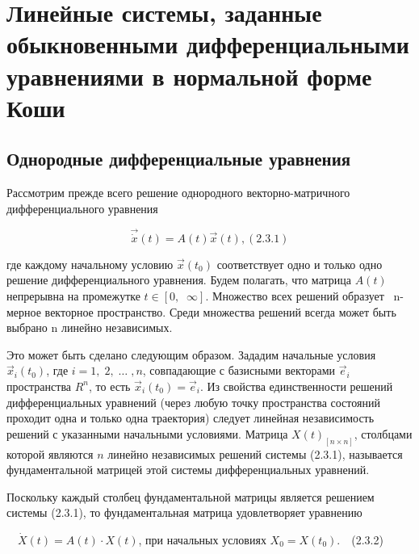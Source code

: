 \bigskip



\bigskip

\section{Линейные системы, заданные обыкновенными   дифференциальными уравнениями в нормальной форме Коши}
\subsection{Однородные дифференциальные уравнения}
\bigskip


		Рассмотрим прежде всего решение однородного векторно-матричного дифференциального уравнения



	\begin{equation}\label{key}
	\vec{\dot x}(t)=A(t)\vec x(t),  (2.3.1)
	\end{equation}



		где каждому начальному условию  $\vec x(t_0)$ соответствует одно и только одно решение дифференциального уравнения.
		Будем полагать, что матрица  $A(t)$ непрерывна на промежутке  $t\in [0,\;\;\infty ]$. Множество всех решений образует
		\ {n}-мерное векторное пространство. Среди множества решений всегда может быть выбрано {n}
		линейно независимых.



		Это может быть сделано следующим образом. Зададим начальные условия  $\vec x_i(t_0)$, где  $i=1,\;2,\;\ldots \;,n$,
		совпадающие с базисными векторами  $\vec e_i$ пространства  $R^n$, то есть  $\vec x_i(t_0)=\vec e_i$. Из свойства
		единственности решений дифференциальных уравнений (через любую точку пространства состояний проходит одна и только одна
		траектория) следует линейная независимость решений с указанными начальными условиями. Матрица  $X(t)_{\left[n\times
			n\right]}$, столбцами которой являются  $n$ линейно независимых решений системы (2.3.1), называется фундаментальной
		матрицей этой системы дифференциальных уравнений.



		Поскольку каждый столбец фундаментальной матрицы является решением системы (2.3.1), то фундаментальная матрица
		удовлетворяет уравнению



		\ \  $\dot X(t)=A(t)\cdot X(t)$, при начальных условиях  $X_0=X(t_0)$.\ \ (2.3.2)



